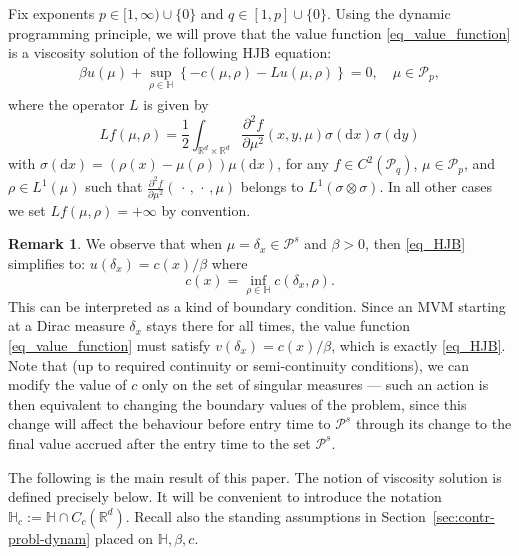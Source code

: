 \documentclass{article}
\theoremstyle{definition}
\newtheorem{remark}[theorem]{\textbf{Remark}}
\numberwithin{equation}{section}
\numberwithin{theorem}{section}
\newcommand{\R}{\mathbb{R}}
\newcommand{\dx}{\mathrm{d}x}
\newcommand{\dy}{\mathrm{d}y}
\newcommand{\Hb}{\mathbb{H}}
\newcommand{\Pcal}{{\mathcal P}}
\newcommand{\fdot}{{\,\cdot\,}}
\begin{document}
Fix exponents $p \in [1,\infty) \cup \{0\}$ and $q \in [1,p] \cup \{0\}$. Using the dynamic programming principle, we will prove that the value function \eqref{eq_value_function} is a viscosity solution of the following HJB equation:
\begin{align}
\beta u(\mu) + \sup_{\rho\in\Hb}\left\{ - c(\mu,\rho) - Lu(\mu,\rho) \right\} = 0, \quad \mu\in\Pcal_p, \label{eq_HJB} 
\end{align}
where
the operator $L$ is %
given by
$$Lf(\mu,\rho)=\frac12  \int_{{\R^d}\times {\R^d}} \frac{\partial^2 f}{\partial \mu^2}(x,y,\mu) \sigma(\dx)\sigma(\dy)$$
with $\sigma(\dx)=(\rho(x)-\mu(\rho))\mu(\dx)$, for any $f \in C^2(\Pcal_q)$, $\mu \in \Pcal_p$, and $\rho \in L^1(\mu)$ such that $\frac{\partial^2 f}{\partial \mu^2}(\fdot,\fdot,\mu)$ belongs to $L^1(\sigma \otimes \sigma)$. In all other cases we set $Lf(\mu,\rho)=+\infty$ by convention.



\begin{remark}\label{rem3}
We observe that when $\mu = \delta_x \in \mathcal{P}^s$ and $\beta > 0$, then \eqref{eq_HJB} simplifies to: $u(\delta_x)=c(x)/\beta$ 
where
\[
c(x) = \inf_{\rho\in \mathbb H}  c(\delta_x,\rho).
\]
This can be interpreted as a kind of boundary condition. Since an MVM starting at a Dirac measure $\delta_x$ stays there for all times, the value function \eqref{eq_value_function} must satisfy $v(\delta_x)=c(x)/\beta$, which is exactly \eqref{eq_HJB}. Note that (up to required continuity or semi-continuity conditions), we can modify the value of $c$ only on the set of singular measures --- such an action is then equivalent to changing the boundary values of the problem, since this change will affect the behaviour before entry time to $\mathcal{P}^s$ through its change to the final value accrued after the entry time to the set $\mathcal{P}^s$.
\end{remark}


The following is the main result of this paper. The notion of viscosity solution is defined precisely below. It will be convenient to introduce the notation $\Hb_c := \Hb \cap C_c(\R^d)$. Recall also the standing assumptions in Section~\ref{sec:contr-probl-dynam} placed on $\Hb,\beta,c$. 
\end{document}
